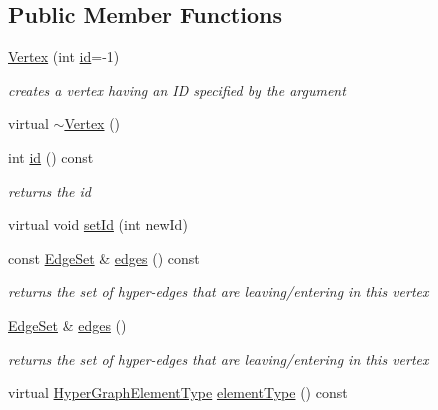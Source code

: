 \subsection*{Public Member Functions}
\begin{DoxyCompactItemize}
\item 
\hyperlink{classg2o_1_1HyperGraph_1_1Vertex_a7f2e986815608e5ac4a44671ed9794ae}{Vertex} (int \hyperlink{classg2o_1_1HyperGraph_1_1Vertex_ad76b71c368b71971ac5affb5d57183d3}{id}=-\/1)
\begin{DoxyCompactList}\small\item\em creates a vertex having an ID specified by the argument \end{DoxyCompactList}\item 
virtual \hyperlink{classg2o_1_1HyperGraph_1_1Vertex_a4c3da5bcc97c960c43bc49cc2ade649c}{$\sim$\+Vertex} ()
\item 
int \hyperlink{classg2o_1_1HyperGraph_1_1Vertex_ad76b71c368b71971ac5affb5d57183d3}{id} () const 
\begin{DoxyCompactList}\small\item\em returns the id \end{DoxyCompactList}\item 
virtual void \hyperlink{classg2o_1_1HyperGraph_1_1Vertex_ac861d25447d8ff167d23c45458f7382f}{set\+Id} (int new\+Id)
\item 
const \hyperlink{classg2o_1_1HyperGraph_a5e2970e236c0dcb4eff7c205d7b6b4ae}{Edge\+Set} \& \hyperlink{classg2o_1_1HyperGraph_1_1Vertex_a0805a5575511327262c89585f1953b8e}{edges} () const 
\begin{DoxyCompactList}\small\item\em returns the set of hyper-\/edges that are leaving/entering in this vertex \end{DoxyCompactList}\item 
\hyperlink{classg2o_1_1HyperGraph_a5e2970e236c0dcb4eff7c205d7b6b4ae}{Edge\+Set} \& \hyperlink{classg2o_1_1HyperGraph_1_1Vertex_a35cbf4ea796797bb5d9c35a41454e8fb}{edges} ()
\begin{DoxyCompactList}\small\item\em returns the set of hyper-\/edges that are leaving/entering in this vertex \end{DoxyCompactList}\item 
virtual \hyperlink{classg2o_1_1HyperGraph_af603119d5d3475aed6e34ee9d701b69e}{Hyper\+Graph\+Element\+Type} \hyperlink{classg2o_1_1HyperGraph_1_1Vertex_a0f7f29e5924b61b68b8e19ed142b68d0}{element\+Type} () const 
\end{DoxyCompactItemize}
